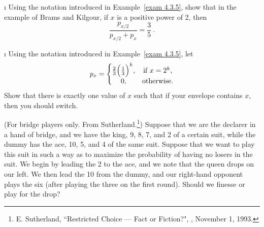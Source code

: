 \begin{LJSItem}
\i\label{exer 4.3.4}  Using the notation introduced in Example~\ref{exam 4.3.5}, show that in the
example of Brams and Kilgour, if $x$ is a positive power of
2, then
$$
\frac{p_{x/2}}{p_{x/2} + p_x} = \frac 35\ .
$$

\i\label{exer 4.3.5} Using the notation introduced in Example~\ref{exam 4.3.5}, let
$$
p_x = \left \{ \begin{matrix}
               \frac 23 \Bigl(\frac 13\Bigr)^k, & \mbox{if}\,\, x = 2^k, \cr
               0, & \mbox{otherwise.}\cr
\end{matrix}\right.
$$
Show that there is exactly one value of $x$ such that if your envelope contains $x$,
then you should switch.


\istar\label{exer 4.3.6} (For bridge players only.  From
Sutherland.\footnote{E. Sutherland, ``Restricted Choice --- Fact or Fiction?", , November 1, 1993.})  
Suppose that we are the declarer in a hand of bridge, and we have the king, 9, 8, 7, and 2  of a
certain suit, while the dummy has the ace, 10, 5, and 4 of the same suit.  Suppose that  we want
to play this suit in such a way as to maximize the probability of having no losers  in the suit. 
We begin by leading the 2 to the ace, and we note that the queen drops on our  left.  We then lead
the 10 from the dummy, and our right-hand opponent plays the six (after playing the three on the
first round).  Should we finesse or play for the drop?


\end{LJSItem}


